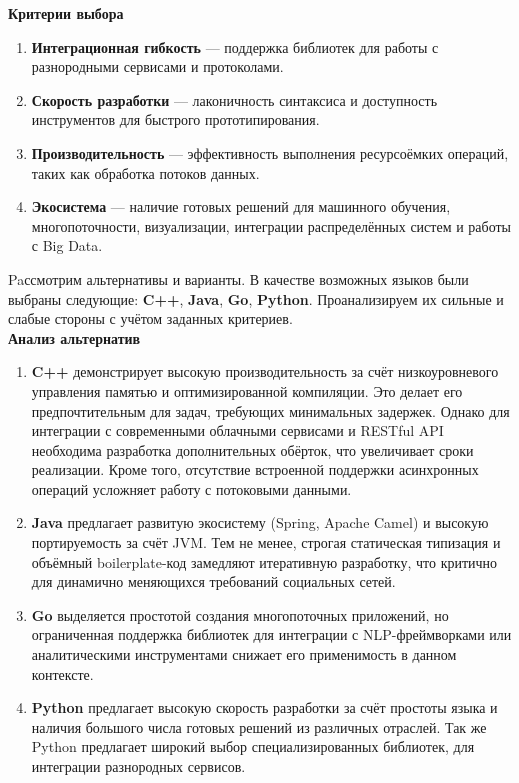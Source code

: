             \textbf{Критерии выбора}
            \begin{enumerate}
                \item \textbf{Интеграционная гибкость} — поддержка библиотек для работы с разнородными сервисами и протоколами.
                \item \textbf{Скорость разработки} — лаконичность синтаксиса и доступность инструментов для быстрого прототипирования.
                \item \textbf{Производительность} — эффективность выполнения ресурсоёмких операций, таких как обработка потоков данных.
                \item \textbf{Экосистема} — наличие готовых решений для машинного обучения, многопоточности, визуализации, интеграции распределённых систем и работы с Big Data.
            \end{enumerate}
            
            Paссмотрим альтернативы и варианты. В качестве возможных языков были выбраны следующие: \textbf{C++}, \textbf{Java}, \textbf{Go}, \textbf{Python}. Проанализируем их сильные и слабые стороны с учётом заданных критериев. \\

            \textbf{Анализ альтернатив}
            \begin{enumerate}
                \item \textbf{C++} демонстрирует высокую производительность за счёт низкоуровневого управления памятью и оптимизированной компиляции. Это делает его предпочтительным для задач, требующих минимальных задержек. Однако для интеграции с современными облачными сервисами и RESTful API необходима разработка дополнительных обёрток, что увеличивает сроки реализации. Кроме того, отсутствие встроенной поддержки асинхронных операций усложняет работу с потоковыми данными.
                \item \textbf{Java} предлагает развитую экосистему (Spring, Apache Camel) и высокую портируемость за счёт JVM. Тем не менее, строгая статическая типизация и объёмный boilerplate-код замедляют итеративную разработку, что критично для динамично меняющихся требований социальных сетей.
                \item \textbf{Go} выделяется простотой создания многопоточных приложений, но ограниченная поддержка библиотек для интеграции с NLP-фреймворками или аналитическими инструментами снижает его применимость в данном контексте.
                \item \textbf{Python} предлагает высокую скорость разработки за счёт простоты языка и наличия большого числа готовых решений из различных отраслей. Так же Python предлагает широкий выбор специализированных библиотек, для интеграции разнородных сервисов. 
            \end{enumerate}
            

